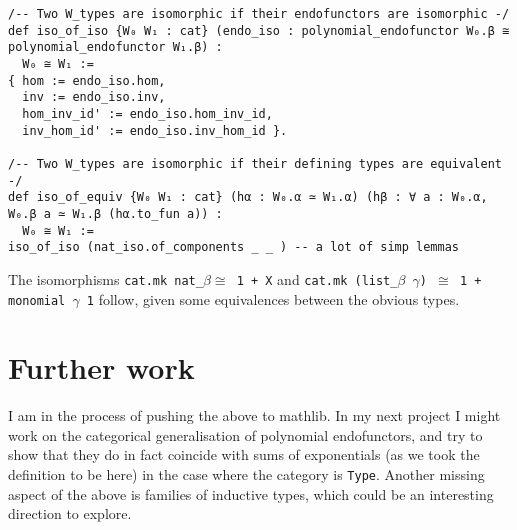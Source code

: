 \documentclass{article}
\newcommand{\be}{\beta}
\newcommand{\ga}{\gamma}
\newcommand{\iso}{\cong}
\newcommand{\<}{\langle}
\renewcommand{\>}{\rangle}
\theoremstyle{definitionstyle}
\theoremstyle{exercisestyle}
\theoremstyle{remarkstyle}
\begin{document}
\begin{lstlisting}
/-- Two W_types are isomorphic if their endofunctors are isomorphic -/
def iso_of_iso {W₀ W₁ : cat} (endo_iso : polynomial_endofunctor W₀.β ≅ polynomial_endofunctor W₁.β) :
  W₀ ≅ W₁ :=
{ hom := endo_iso.hom,
  inv := endo_iso.inv,
  hom_inv_id' := endo_iso.hom_inv_id,
  inv_hom_id' := endo_iso.inv_hom_id }.

/-- Two W_types are isomorphic if their defining types are equivalent -/
def iso_of_equiv {W₀ W₁ : cat} (hα : W₀.α ≃ W₁.α) (hβ : ∀ a : W₀.α, W₀.β a ≃ W₁.β (hα.to_fun a)) :
  W₀ ≅ W₁ :=
iso_of_iso (nat_iso.of_components _ _ ) -- a lot of simp lemmas \end{lstlisting}

The isomorphisms \texttt{cat.mk nat\_$\be \iso $ 1 + X} and
\texttt{cat.mk (list\_$\be$ $\ga$) $\iso$ 1 + monomial $\ga$ 1}
follow, given some equivalences between the obvious types.

\section{Further work}

I am in the process of pushing the above to mathlib.
In my next project I might work on the categorical generalisation of
polynomial endofunctors, and try to show that they do in fact coincide
with sums of exponentials (as we took the definition to be here) in the case  where the category is \texttt{Type}.
Another missing aspect of the above is families of inductive types,
which could be an interesting direction to explore.

{}

\end{document}
